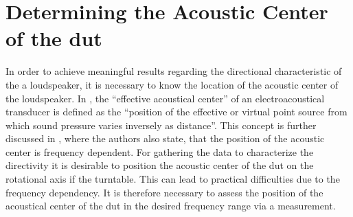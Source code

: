 \section{Determining the Acoustic Center of the \gls{dut}}\label{sec:ac_center}
In order to achieve meaningful results regarding the directional characteristic of the a loudspeaker, it is necessary to know the location of the  acoustic center of the loudspeaker.
In \citep{ansis1.1}, the ``effective acoustical center'' of an electroacoustical transducer is defined as the ``position of the effective or virtual point source from which sound pressure varies inversely as distance''. This concept is further discussed in \citep{jacobsenetal}, where the authors also state, that the position of the acoustic center is frequency dependent. For gathering the data to characterize the directivity it is desirable to position the acoustic center of the \gls{dut} on the rotational axis if the turntable. This can lead to practical difficulties due to the frequency dependency. It is therefore necessary to assess the position of the acoustical center of the \gls{dut} in the desired frequency range via a measurement.\\


